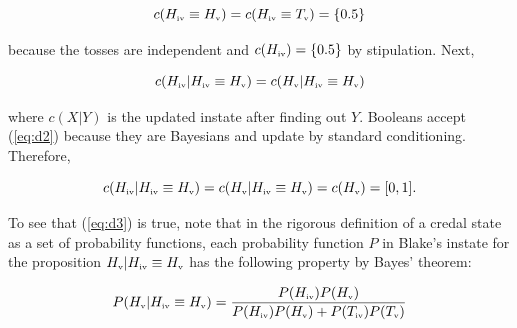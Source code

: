 \documentclass[phd,12pt,oneside]{ubcthesis}
\begin{document}
\begin{equation}
  \label{eq:d1}
  c(H_{\mbox{\tiny{iv}}}\equiv{}H_{\mbox{\tiny{v}}})=c(H_{\mbox{\tiny{iv}}}\equiv{}T_{\mbox{\tiny{v}}})=\{0.5\}
\end{equation}

{\noindent}because the tosses are independent and
$c(H_{\mbox{\tiny{iv}}})=\{0.5\}$ by stipulation. Next,

\begin{equation}
  \label{eq:d2}
  c(H_{\mbox{\tiny{iv}}}|H_{\mbox{\tiny{iv}}}\equiv{}H_{\mbox{\tiny{v}}})=c(H_{\mbox{\tiny{v}}}|H_{\mbox{\tiny{iv}}}\equiv{}H_{\mbox{\tiny{v}}})
\end{equation}

{\noindent}where $c(X|Y)$ is the updated instate after finding out $Y$. Booleans
accept (\ref{eq:d2}) because they are Bayesians and update by standard
conditioning. Therefore,


\begin{equation}
  \label{eq:d3}
  c(H_{\mbox{\tiny{iv}}}|H_{\mbox{\tiny{iv}}}\equiv{}H_{\mbox{\tiny{v}}})=c(H_{\mbox{\tiny{v}}}|H_{\mbox{\tiny{iv}}}\equiv{}H_{\mbox{\tiny{v}}})=c(H_{\mbox{\tiny{v}}})=[0,1].
\end{equation}

{\noindent}To see that (\ref{eq:d3}) is true, note that in the rigorous
definition of a credal state as a set of probability functions, each
probability function $P$ in Blake's instate for the proposition
$H_{\mbox{\tiny{v}}}|H_{\mbox{\tiny{iv}}}\equiv{}H_{\mbox{\tiny{v}}}$
has the following property by Bayes' theorem:

\begin{equation}
  \label{eq:zeibaefu}
  P(H_{\mbox{\tiny{v}}}|H_{\mbox{\tiny{iv}}}\equiv{}H_{\mbox{\tiny{v}}})=\frac{P(H_{\mbox{\tiny{iv}}})P(H_{\mbox{\tiny{v}}})}{P(H_{\mbox{\tiny{iv}}})P(H_{\mbox{\tiny{v}}})+P(T_{\mbox{\tiny{iv}}})P(T_{\mbox{\tiny{v}}})}
\end{equation}
\end{document}
